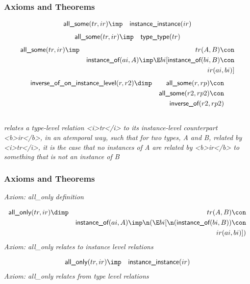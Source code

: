\subsubsection{Axioms and Theorems}


\begin{eqnarray*}
 \pr{all\_some}(tr, ir) &\imp & \pr{instance\_instance}(ir) 
\end{eqnarray*}
\begin{eqnarray*}
 \pr{all\_some}(tr, ir) &\imp & \pr{type\_type}(tr) 
\end{eqnarray*}
\begin{eqnarray*}
 \pr{all\_some}(tr, ir) &\imp &tr(A, B) \con \\
&& \pr{instance\_of}(ai, A) \imp  \E bi[ \pr{instance\_of}(bi, B) \con \\
&&ir(ai, bi) ]
\end{eqnarray*}
\begin{eqnarray*}
 \pr{inverse\_of\_on\_instance\_level}(r, r2) &\dimp & \pr{all\_some}(r, rp) \con \\
&& \pr{all\_some}(r2, rp2) \con \\
&& \pr{inverse\_of}(r2, rp2) 
\end{eqnarray*}

\subsection{ }
\emph{relates a type-level relation <i>tr</i> to its instance-level counterpart <b>ir</b>, in an atemporal way, such that for two types, A and B, related by <i>tr</i>, it is the case that no instances of A are related by <b>ir</b> to something that is not an instance of B}

\subsubsection{Axioms and Theorems}


\emph{Axiom: all\_only definition}

\begin{eqnarray*}
 \pr{all\_only}(tr, ir) &\dimp &tr(A, B) \con \\
&& \pr{instance\_of}(ai, A) \imp  \n( \E bi[ \n( \pr{instance\_of}(bi, B) )\con \\
&&ir(ai, bi) ])
\end{eqnarray*}
\emph{Axiom: all\_only relates to instance level relations}

\begin{eqnarray*}
 \pr{all\_only}(tr, ir) &\imp & \pr{instance\_instance}(ir) 
\end{eqnarray*}
\emph{Axiom: all\_only relates from type level relations}

